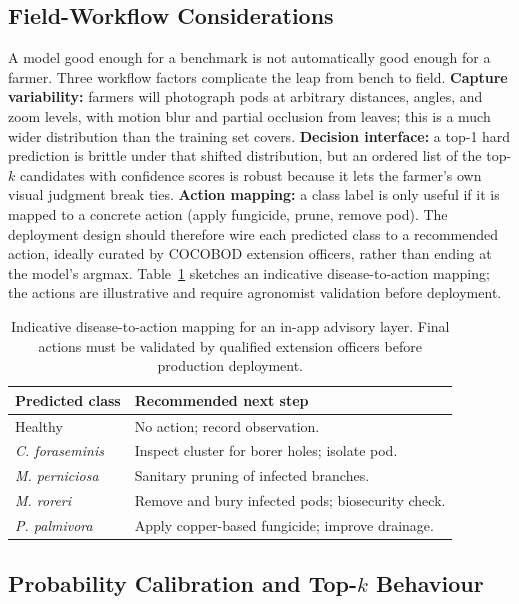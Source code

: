 \documentclass[conference,10pt]{IEEEtran}
\begin{document}
\subsection{Field-Workflow Considerations}

A model good enough for a benchmark is not automatically good enough for a
farmer. Three workflow factors complicate the leap from bench to field.
\textbf{Capture variability:} farmers will photograph pods at arbitrary
distances, angles, and zoom levels, with motion blur and partial occlusion
from leaves; this is a much wider distribution than the training set covers.
\textbf{Decision interface:} a top-1 hard prediction is brittle under that
shifted distribution, but an ordered list of the top-$k$ candidates with
confidence scores is robust because it lets the farmer's own visual judgment
break ties. \textbf{Action mapping:} a class label is only useful if it is
mapped to a concrete action (apply fungicide, prune, remove pod). The
deployment design should therefore wire each predicted class to a recommended
action, ideally curated by COCOBOD extension officers, rather than ending at
the model's argmax. Table~\ref{tab:field_actions} sketches an indicative
disease-to-action mapping; the actions are illustrative and require
agronomist validation before deployment.

\begin{table}[t]
\centering
\caption{Indicative disease-to-action mapping for an in-app advisory layer.
Final actions must be validated by qualified extension officers before
production deployment.}
\label{tab:field_actions}
\renewcommand{\arraystretch}{1.15}
\begin{tabular}{p{}p{}}
\toprule
\textbf{Predicted class} & \textbf{Recommended next step} \\
\midrule
Healthy & No action; record observation. \\
\textit{C. foraseminis} & Inspect cluster for borer holes; isolate pod. \\
\textit{M. perniciosa} & Sanitary pruning of infected branches. \\
\textit{M. roreri} & Remove and bury infected pods; biosecurity check. \\
\textit{P. palmivora} & Apply copper-based fungicide; improve drainage. \\
\bottomrule
\end{tabular}
\end{table}

\subsection{Probability Calibration and Top-$k$ Behaviour}\label{ssec:calib}
\end{document}
